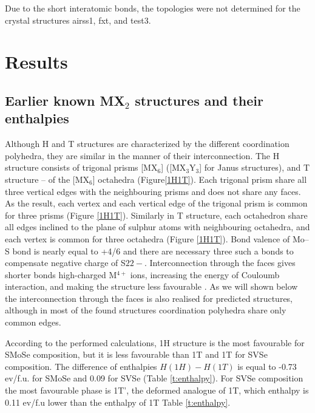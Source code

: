 \documentclass[a4paperm]{article}
\begin{document}
Due to the short interatomic bonds, the topologies were not determined for the crystal structures airss1, fxt, and  test3.


			\section{Results}

\subsection*{Earlier known MX$_2$ structures and their enthalpies}

Although H and T structures are characterized by the different coordination polyhedra, they are similar in the manner of their interconnection.
The H structure consists of trigonal prisms [MX$_6$] ([MX$_3$Y$_3$] for Janus structures), and T structure – of the [MX$_6$] octahedra (Figure\ref{1H1T}).
Each trigonal prism share all three vertical edges with the neighbouring prisms and does not share any faces.
As the result, each vertex and each vertical edge of the trigonal prism is common for three prisms (Figure \ref{1H1T}).
Similarly in T structure, each octahedron share all edges inclined to the plane of sulphur atoms with neighbouring octahedra, and each vertex is common for three octahedra (Figure \ref{1H1T}).
Bond valence of Mo--S bond is nearly equal to +4/6 and there are necessary three such a bonds to compensate negative charge of S$2{2-}$.
Interconnection through the faces gives shorter bonds high-charged M$^{4+}$ ions, increasing the energy of Couloumb interaction, and making the structure less favourable \cite{pauling1929}.
As we will shown below the interconnection through the faces is also realised for predicted structures, although in most of the found structures coordination polyhedra share only common edges.

According to the performed calculations, 1H structure is the most favourable for SMoSe composition, but it is less favourable than 1T and 1T for SVSe composition.
The difference of enthalpies $H(1H)-H(1T)$ is equal to -0.73 ev/f.u. for SMoSe and 0.09 for SVSe (Table \ref{t:enthalpy}).
For SVSe composition the most favourable phase is 1T', the deformed analogue of 1T, which enthalpy is 0.11 ev/f.u lower than the enthalpy of 1T Table \ref{t:enthalpy}. 
\end{document}
